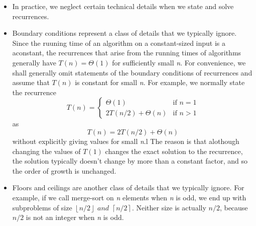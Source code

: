 \documentclass{report}
\begin{document}
\begin{itemize}
    \item In practice, we neglect certain technical details when we state and solve recurrences.
    \item Boundary conditions represent a class of details that we typically ignore. Since the ruuning time of an algorithm on a constant-sized input is a aconstant, the recurrences that arise from the running times of algorithms generally have $T(n) = \Theta(1)$ for sufficiently small \textit{n}. For convenience, we shall generally omit statements of the boundary conditions of recurrences and assume that $T(n)$ is constant for small \textit{n}. For example, we normally state the recurrence
    \[
        T(n) = 
        \begin{cases}
            \Theta(1) & \text{if $n = 1$} \\
            2T(n/2) + \Theta(n) & \text{if $n >1$}
        \end{cases}    
    \]
    as
    $$T(n) = 2T(n/2) + \Theta(n)$$
    without explicitly giving values for small \textit{n}.l The reason is that alothough changing the values of $T(1)$ changes the exact solution to the recurrence, the solution typically doesn't change by more than a constant factor, and so the order of growth is unchanged.
    \item Floors and ceilings are another class of details that we typically ignore. For example, if we call merge-sort on \textit{n} elements when \textit{n} is odd, we end up with subproblems of size $\left \lfloor{n/2} \right \rfloor \textit{ and } \left \lceil{n/2} \right \rceil$. Neither size is actually $n/2$, because $n/2$ is not an integer when \textit{n} is odd.
\end{itemize}
\end{document}
